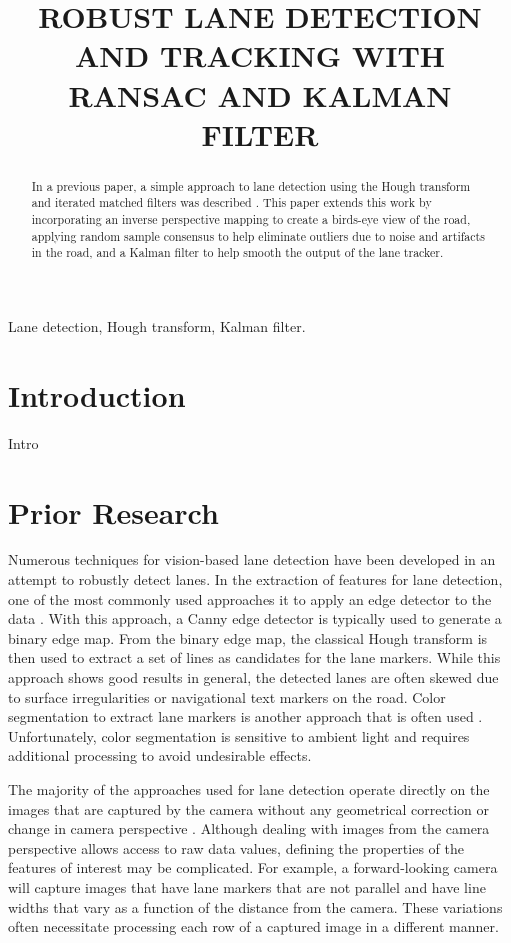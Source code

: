 \documentclass{article}
\title{ROBUST LANE DETECTION AND TRACKING WITH RANSAC AND KALMAN FILTER}
\begin{document}
%
\maketitle
%
\begin{abstract}
In a previous paper, a simple approach to lane detection using the Hough 
transform and iterated matched filters was described \cite{borkar_layered_2009}.
This paper extends this work by incorporating an inverse perspective mapping 
to create a birds-eye view of the road, applying random sample consensus to help 
eliminate outliers due to noise and artifacts in the road, and a Kalman filter
to help smooth the output of the lane tracker.
\end{abstract}
%
\begin{keywords}
Lane detection, Hough transform, Kalman filter.
\end{keywords}
%
\section{Introduction}
\label{sec:intro}
Intro

\section{Prior Research}
\label{sec:prior}
Numerous techniques for vision-based lane detection have been developed in an attempt to robustly detect lanes.
In the extraction of features for lane detection, one of the most commonly used approaches it to apply an edge detector to the data \cite{assidiq_real_2008,wang_driver_2005}. With this approach, a Canny edge detector is typically used to generate a binary edge map. From the binary edge map, the classical Hough transform is then used to extract a set of lines as candidates for the lane markers.  While this approach shows good results in general, the detected lanes are often skewed due to surface irregularities or navigational text markers on the road. Color segmentation to extract lane markers is another approach that is often used \cite{sun_hsi_2006,chin_lane_2005}. Unfortunately, color segmentation is sensitive to ambient light and requires additional processing to avoid undesirable effects.

The majority of the approaches used for lane detection operate directly on the images that are captured by the camera without any geometrical correction or change in camera perspective \cite{borkar_layered_2009,assidiq_real_2008,sun_hsi_2006,wang_real-time_2006}.
Although dealing with images from the camera perspective allows access to raw data values, defining the properties of the features of interest may be complicated. For example, a forward-looking camera will capture images that have lane markers that are not parallel and have line widths that vary as a function of the distance from the camera.  These variations often necessitate processing each row of a captured image in a different manner.
\end{document}
